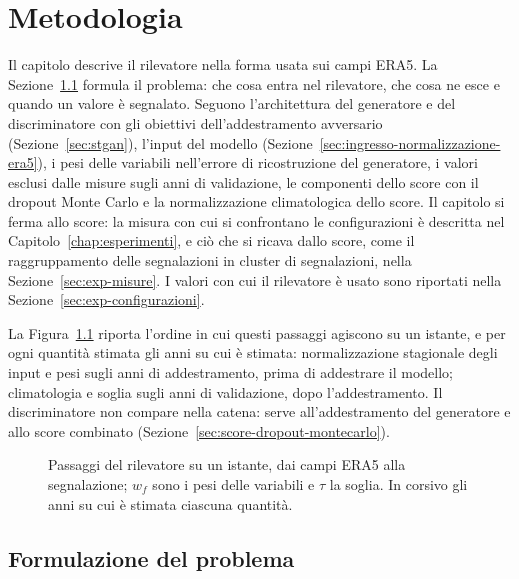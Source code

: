 \chapter{Metodologia}
\label{chap:metodologia}

Il capitolo descrive il rilevatore nella forma usata sui campi ERA5. La Sezione~\ref{sec:formulazione} formula il problema: che cosa entra nel rilevatore, che cosa ne esce e quando un valore è segnalato. Seguono l'architettura del generatore e del discriminatore con gli obiettivi dell'addestramento avversario (Sezione~\ref{sec:stgan}), l'input del modello (Sezione~\ref{sec:ingresso-normalizzazione-era5}), i pesi delle variabili nell'errore di ricostruzione del generatore, i valori esclusi dalle misure sugli anni di validazione, le componenti dello score con il dropout Monte Carlo e la normalizzazione climatologica dello score. Il capitolo si ferma allo score: la misura con cui si confrontano le configurazioni è descritta nel Capitolo~\ref{chap:esperimenti}, e ciò che si ricava dallo score, come il raggruppamento delle segnalazioni in cluster di segnalazioni, nella Sezione~\ref{sec:exp-misure}. I valori con cui il rilevatore è usato sono riportati nella Sezione~\ref{sec:exp-configurazioni}.

La Figura~\ref{fig:catena-rilevatore} riporta l'ordine in cui questi passaggi agiscono su un istante, e per ogni quantità stimata gli anni su cui è stimata: normalizzazione stagionale degli input e pesi sugli anni di addestramento, prima di addestrare il modello; climatologia e soglia sugli anni di validazione, dopo l'addestramento. Il discriminatore non compare nella catena: serve all'addestramento del generatore e allo score combinato (Sezione~\ref{sec:score-dropout-montecarlo}).

\begin{figure}[htbp]
    \centering
    
    \caption{Passaggi del rilevatore su un istante, dai campi ERA5 alla segnalazione; $w_f$ sono i pesi delle variabili e $\tau$ la soglia. In corsivo gli anni su cui è stimata ciascuna quantità.}
    \label{fig:catena-rilevatore}
\end{figure}

\section{Formulazione del problema}
\label{sec:formulazione}

